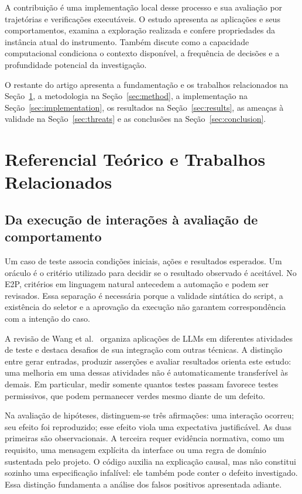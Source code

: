 \documentclass[12pt]{article}
\begin{document}
A contribuição é uma implementação local desse processo e sua avaliação por trajetórias e verificações executáveis. O estudo apresenta as aplicações e seus comportamentos, examina a exploração realizada e confere propriedades da instância atual do instrumento. Também discute como a capacidade computacional condiciona o contexto disponível, a frequência de decisões e a profundidade potencial da investigação.

O restante do artigo apresenta a fundamentação e os trabalhos relacionados na Seção~\ref{sec:related}, a metodologia na Seção~\ref{sec:method}, a implementação na Seção~\ref{sec:implementation}, os resultados na Seção~\ref{sec:results}, as ameaças à validade na Seção~\ref{sec:threats} e as conclusões na Seção~\ref{sec:conclusion}.

\section{Referencial Teórico e Trabalhos Relacionados}\label{sec:related}
\subsection{Da execução de interações à avaliação de comportamento}
Um caso de teste associa condições iniciais, ações e resultados esperados. Um oráculo é o critério utilizado para decidir se o resultado observado é aceitável. No E2P, critérios em linguagem natural antecedem a automação e podem ser revisados. Essa separação é necessária porque a validade sintática do script, a existência do seletor e a aprovação da execução não garantem correspondência com a intenção do caso.

A revisão de Wang et al.~\cite{wang2024survey} organiza aplicações de LLMs em diferentes atividades de teste e destaca desafios de sua integração com outras técnicas. A distinção entre gerar entradas, produzir asserções e avaliar resultados orienta este estudo: uma melhoria em uma dessas atividades não é automaticamente transferível às demais. Em particular, medir somente quantos testes passam favorece testes permissivos, que podem permanecer verdes mesmo diante de um defeito.

Na avaliação de hipóteses, distinguem-se três afirmações: uma interação ocorreu; seu efeito foi reproduzido; esse efeito viola uma expectativa justificável. As duas primeiras são observacionais. A terceira requer evidência normativa, como um requisito, uma mensagem explícita da interface ou uma regra de domínio sustentada pelo projeto. O código auxilia na explicação causal, mas não constitui sozinho uma especificação infalível: ele também pode conter o defeito investigado. Essa distinção fundamenta a análise dos falsos positivos apresentada adiante.
\end{document}
